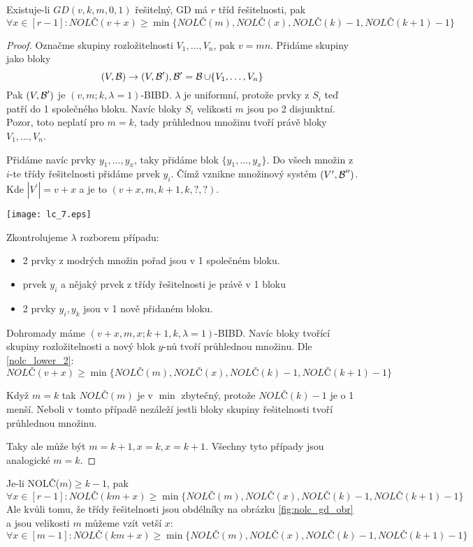 \begin{theorem}
    Existuje-li $GD(v,k,m,0,1)$ řešitelný, GD má $r$ tříd řešitelnosti, pak
    \[\forall x \in [r - 1]: NOLČ(v+x) \geq \min \{NOLČ(m), NOLČ(x), NOLČ(k)-1, NOLČ(k+1)-1\} \]
\end{theorem}
\begin{proof}
	Označme skupiny rozložitelnosti $V_1, \ldots, V_n$, pak $v = mn$.
	Přidáme skupiny jako bloky
	\[ (V, \operatorname{\mathcal{B}}) \to (V, \operatorname{\mathcal{B}}^{\prime}), \operatorname{\mathcal{B}}^{\prime} = \operatorname{\mathcal{B}} \cup \{ V_1, \ldots, V_n \} \]
	Pak $(V, \operatorname{\mathcal{B}}^{\prime})$ je $(v, m; k, \lambda = 1)$-BIBD.
	$\lambda$ je uniformní, protože prvky z $S_i$ teď patří do 1 společného bloku.
	Navíc bloky $S_i$ velikosti $m$ jsou po 2 disjunktní.
	Pozor, toto neplatí pro $m = k$, tady průhlednou množinu tvoří právě bloky $V_1, \ldots, V_n$.

	Přidáme navíc prvky $y_1, \ldots, y_x$, taky přidáme blok $\{ y_1, \ldots, y_x \}$.
	Do všech množin z $i$-te třídy řešitelnosti přidáme prvek $y_i$.
	Čímž vznikne množinový systém $(V^{\prime}, \operatorname{\mathcal{B}}^{\prime\prime})$.
	Kde $|V^{\prime}| = v + x$ a je to $(v + x, m, k + 1, k, ?, ?)$.

	\texttt{[image: lc\_7.eps]}

	Zkontrolujeme $\lambda$ rozborem případu:
	\begin{itemize}
		\item 2 prvky z modrých množin pořad jsou v 1 společném bloku.
		\item prvek $y_i$ a nějaký prvek z třídy řešitelnosti je právě v 1 bloku
		\item 2 prvky $y_i, y_k$ jsou v 1 nově přidaném bloku.
	\end{itemize}
	Dohromady máme $(v + x, m, x; k + 1, k, \lambda = 1)$-BIBD.
	Navíc bloky tvořící skupiny rozložitelnosti a nový blok $y$-nů tvoří průhlednou množinu.
	Dle \cref{nolc_lower_2}:
	\[ NOLČ(v+x) \geq \min \{NOLČ(m), NOLČ(x), NOLČ(k)-1, NOLČ(k+1)-1\} \]

	Když $m = k$ tak $NOLČ(m)$ je v $\min$ zbytečný, protože $NOLČ(k)-1$ je o 1 menší.
	Neboli v tomto případě nezáleží jestli bloky skupiny řešitelnosti tvoří průhlednou množinu.

	Taky ale může být $m = k + 1, x = k, x = k + 1$.
	Všechny tyto případy jsou analogické $m = k$.
\end{proof}

\begin{consequence}\label{nolc_mult}
    Je-li NOLČ($m$)$\geq k-1$, pak
    \[ \forall x \in [r-1]: NOLČ(km+x) \geq \min\{NOLČ(m), NOLČ(x), NOLČ(k)-1, NOLČ(k+1)-1\} \]
    Ale kvůli tomu, že třídy řešitelnosti jsou obdélníky na obrázku \cref{fig:nolc_gd_obr} a jsou velikosti $m$ můžeme vzít vetší $x$:
    \[ \forall x \in [m-1]: NOLČ(km+x) \geq \min\{NOLČ(m), NOLČ(x), NOLČ(k)-1, NOLČ(k+1)-1\} \]
\end{consequence}

